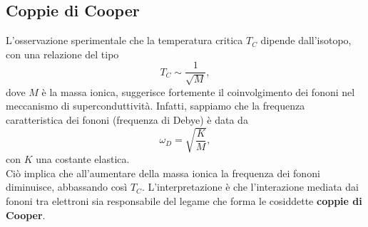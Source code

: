 \subsection{Coppie di Cooper}
L'osservazione sperimentale che la temperatura critica \(T_C\) dipende dall'isotopo, con una relazione del tipo
\[
T_C \sim \frac{1}{\sqrt{M}},
\]
dove \(M\) è la massa ionica, suggerisce fortemente il coinvolgimento dei fononi nel meccanismo di superconduttività. Infatti, sappiamo che la frequenza caratteristica dei fononi (frequenza di Debye) è data da
\[
\omega_D = \sqrt{\frac{K}{M}},
\]
con \(K\) una costante elastica. \\
Ciò implica che all'aumentare della massa ionica la frequenza dei fononi diminuisce, abbassando così \(T_C\). L'interpretazione è che l'interazione mediata dai fononi tra elettroni sia responsabile del legame che forma le cosiddette \textbf{coppie di Cooper}.\\\\

